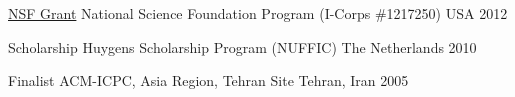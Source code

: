 

\begin{cvhonors}

  \cvhonor
    {\href{https://www.nsf.gov/awardsearch/showAward?AWD_ID=1217250}{NSF Grant}} %
    {National Science Foundation Program (I-Corps \#1217250)} %
    {USA} %
    {2012} %

  \cvhonor
    {Scholarship} %
    {Huygens Scholarship Program (NUFFIC)} %
    {The Netherlands} %
    {2010} %

  \cvhonor
    {Finalist} %
    {ACM-ICPC, Asia Region, Tehran Site} %
    {Tehran, Iran} %
    {2005} %

\end{cvhonors}
